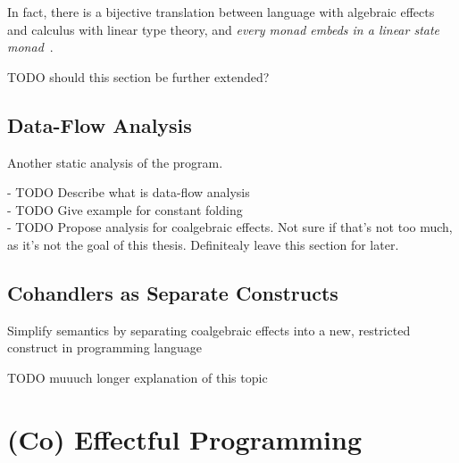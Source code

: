 \documentclass[declaration,shortabstract]{iithesis}
\theoremstyle{definition} \newtheorem{definition}{Definition}[chapter]
\theoremstyle{remark} \newtheorem{remark}[definition]{Observation}
\theoremstyle{plain} \newtheorem{theorem}[definition]{Theorem}
\theoremstyle{plain} \newtheorem{lemma}[definition]{Lemma}
\begin{document}
In fact, there is a bijective translation between language with algebraic effects
and calculus with linear type theory, and \textit{every monad embeds in a linear
state monad}~\cite{linear-usage-of-state}.

\noindent
TODO should this section be further extended?

\section{Data-Flow Analysis}

Another static analysis of the program.

\noindent
- TODO Describe what is data-flow analysis \\
- TODO Give example for constant folding \\
- TODO Propose analysis for coalgebraic effects. Not sure if that's not too much,
as it's not the goal of this thesis. Definitealy leave this section for later.

\section{Cohandlers as Separate Constructs}

Simplify semantics by separating coalgebraic effects into a new, restricted
construct in programming language

\noindent
TODO muuuch longer explanation of this topic

\chapter{(Co) Effectful Programming}\label{chapter:co-effectful-programming} %


\end{document}

